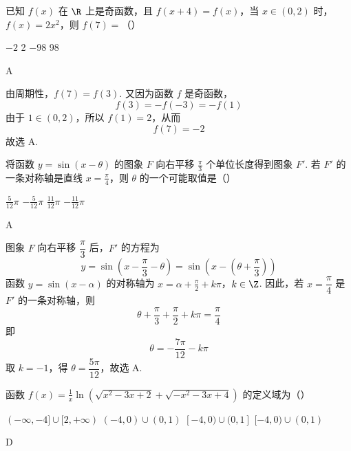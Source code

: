 \begin{problem}
已知 \( f(x) \) 在 \( \R \) 上是奇函数，且 \( f(x + 4) = f(x) \)，当 \( x \in (0,2) \) 时，\( f(x) = 2x^2 \)，则 \( f(7) = \)（\quad）

\choices
    {\(-2\)}
    {2}
    {\(-98\)}
    {98}
\end{problem}

\begin{answer}
A
\end{answer}

\begin{solution}
由周期性，\(f(7)=f(3)\). 又因为函数 \(f\) 是奇函数，
\[
f(3)=-f(-3)=-f(1)
\]
由于 \(1\in(0,2)\)，所以 \(f(1)=2\)，从而
\[
f(7)=-2
\]
故选 A.
\end{solution}

\begin{problem}
将函数 \( y = \sin (x - \theta) \) 的图象 \(F\) 向右平移 \( \frac{\pi}{3} \) 个单位长度得到图象 \(F'\). 若 \(F'\) 的一条对称轴是直线 \( x = \frac{\pi}{4} \)，则 \( \theta \) 的一个可能取值是（\quad）

\choices
    {\( \frac{5}{12}\pi \)}
    {\( -\frac{5}{12}\pi \)}
    {\( \frac{11}{12}\pi \)}
    {\( -\frac{11}{12}\pi \)}
\end{problem}

\begin{answer}
A
\end{answer}

\begin{solution}
图象 \(F\) 向右平移 \(\dfrac{\pi}{3}\) 后，\(F'\) 的方程为
\[
y=\sin\left(x-\frac{\pi}{3}-\theta\right)
=\sin\left(x-\left(\theta+\frac{\pi}{3}\right)\right)
\]
函数 \(y=\sin(x-\alpha)\) 的对称轴为
\(x=\alpha+\frac{\pi}{2}+k\pi\)，\(k\in\Z\).
因此，若 \(x=\dfrac{\pi}{4}\) 是 \(F'\) 的一条对称轴，则
\[
\theta+\frac{\pi}{3}+\frac{\pi}{2}+k\pi=\frac{\pi}{4}
\]
即
\[
\theta=-\frac{7\pi}{12}-k\pi
\]
取 \(k=-1\)，得 \(\theta=\dfrac{5\pi}{12}\)，故选 A.
\end{solution}

\begin{problem}
函数 \( f(x) = \frac{1}{x} \ln (\sqrt{x^2 - 3x + 2} + \sqrt{-x^2 - 3x + 4}) \) 的定义域为（\quad）

\choices
    {\( (-\infty,-4]\cup[2,+\infty) \)}
    {\( (-4,0)\cup(0,1) \)}
    {\( [-4,0)\cup(0,1] \)}
    {\( [-4,0)\cup(0,1) \)}
\end{problem}

\begin{answer}
D
\end{answer}

